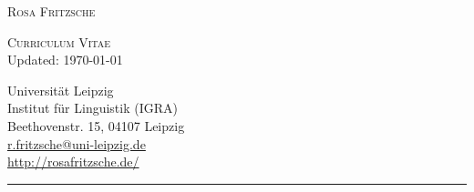 \documentclass[11pt]{article}
\begin{document}
\pagestyle{empty}

\noindent\begin{minipage}{.48\textwidth}

\begin{flushleft}
\huge{\textsc{Rosa Fritzsche}}
\vspace{.5\baselineskip}

\Large{\textsc{Curriculum Vitae}}\\
\vspace{\baselineskip}
\small{Updated: \today}
\end{flushleft}
\end{minipage}\hfill%
\begin{minipage}{.48\textwidth}
\begin{flushright}
	Universität Leipzig\\
	Institut für Linguistik (IGRA)\\
	Beethovenstr. 15, 04107 Leipzig\\
	\href{mailto:r.fritzsche@uni-leipzig.de}{r.fritzsche@uni-leipzig.de} \\
	\href{http://rosafritzsche.de/}{http://rosafritzsche.de/}\\
\end{flushright}
\end{minipage}

\noindent\rule{\textwidth}{1pt}






\end{document}
